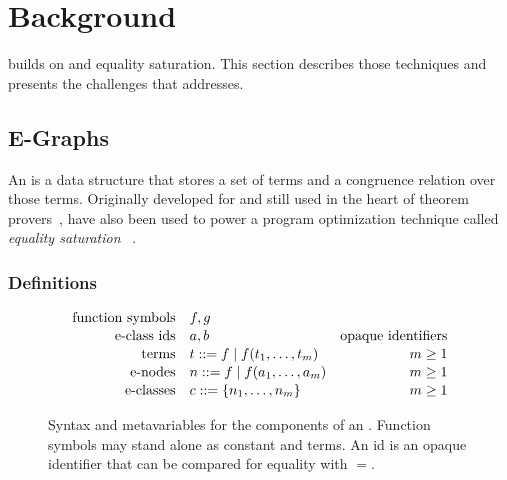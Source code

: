\chapter{Background}
\label{sec:background}

\egg builds on \egraphs and equality saturation.
  This section describes those techniques and
  presents the challenges that \egg addresses.



\section{E-Graphs}
\label{sec:egraphs}

An \textit{\egraph} is a data structure that stores a set of terms and a
  congruence relation over those terms.
Originally developed for and still used in the
  heart of theorem provers~\cite{nelson, simplify, z3},
  \egraphs have also been used to power a program optimization technique
  called \textit{equality saturation}~%
  \cite{denali, eqsat, eqsat-llvm, szalinski, yogo-pldi20, spores, herbie}.

\subsection{Definitions}

\begin{figure}
  \centering
  \begin{align*}
     \text{function symbols} \quad & f,g                                   \\[-0.2em]
     \text{\eclass ids} \quad & a,b & \text{opaque identifiers}            \\[-0.2em]
     \text{terms}     \quad & t  ::= f \mid f(t_1, \ldots, t_m) & m \geq 1 \\[-0.2em]
     \text{\enodes}   \quad & n  ::= f \mid f(a_1, \ldots, a_m) & m \geq 1 \\[-0.2em]
     \text{\eclasses} \quad & c  ::= \{ n_1, \ldots, n_m \}     & m \geq 1
  \end{align*}
  \caption{
    Syntax and metavariables for the components of an \egraph.
    Function symbols may stand alone as constant \enodes and terms.
    An \eclass id is an opaque identifier that can be compared for equality with $=$.
  }
  \label{fig:syntax}
\end{figure}

